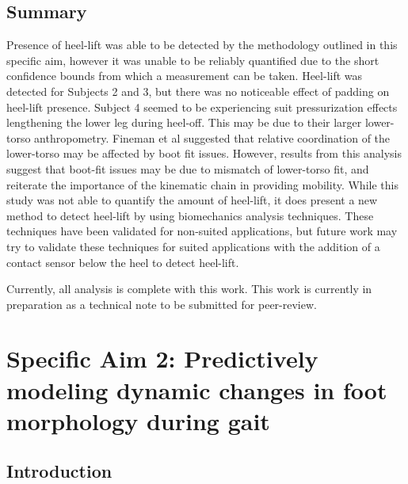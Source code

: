 \documentclass[defaultstyle,11pt]{comps}
\begin{document}
\hypertarget{summary-1}{%
\section{Summary}\label{summary-1}}

Presence of heel-lift was able to be detected by the methodology outlined in this specific aim, however it was unable to be reliably quantified due to the short confidence bounds from which a measurement can be taken.
Heel-lift was detected for Subjects 2 and 3, but there was no noticeable effect of padding on heel-lift presence.
Subject 4 seemed to be experiencing suit pressurization effects lengthening the lower leg during heel-off.
This may be due to their larger lower-torso anthropometry.
Fineman et al \citep{Fineman2018} suggested that relative coordination of the lower-torso may be affected by boot fit issues.
However, results from this analysis suggest that boot-fit issues may be due to mismatch of lower-torso fit, and reiterate the importance of the kinematic chain in providing mobility.
While this study was not able to quantify the amount of heel-lift, it does present a new method to detect heel-lift by using biomechanics analysis techniques.
These techniques have been validated for non-suited applications, but future work may try to validate these techniques for suited applications with the addition of a contact sensor below the heel to detect heel-lift.

Currently, all analysis is complete with this work.
This work is currently in preparation as a technical note to be submitted for peer-review.

\hypertarget{specific-aim-2-predictively-modeling-dynamic-changes-in-foot-morphology-during-gait}{%
\chapter{Specific Aim 2: Predictively modeling dynamic changes in foot morphology during gait}\label{specific-aim-2-predictively-modeling-dynamic-changes-in-foot-morphology-during-gait}}

\hypertarget{introduction-1}{%
\section{Introduction}\label{introduction-1}}
\end{document}
